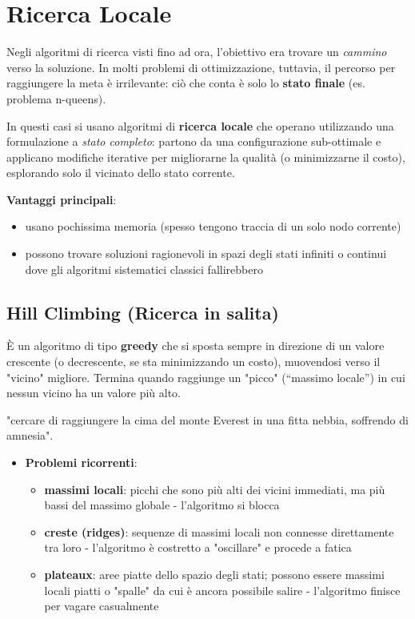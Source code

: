 \documentclass[a4paper,11pt]{report}
\begin{document}
\section{Ricerca Locale}
Negli algoritmi di ricerca visti fino ad ora, l'obiettivo era trovare un \textit{cammino} verso la soluzione. In molti problemi di ottimizzazione, tuttavia, il percorso per raggiungere la meta è irrilevante: ciò che conta è solo lo \textbf{stato finale} (es. problema n-queens).

In questi casi si usano algoritmi di \textbf{ricerca locale} che operano utilizzando una formulazione a \textit{stato completo}: partono da una configurazione sub-ottimale e applicano modifiche iterative per migliorarne la qualità (o minimizzarne il costo), esplorando solo il vicinato dello stato corrente.

\textbf{Vantaggi principali}:
\begin{itemize}
    \item usano pochissima memoria (spesso tengono traccia di un solo nodo corrente)
    \item possono trovare soluzioni ragionevoli in spazi degli stati infiniti o continui dove gli algoritmi sistematici classici fallirebbero
\end{itemize}

\subsection{Hill Climbing (Ricerca in salita)}
È un algoritmo di tipo \textbf{greedy} che si sposta sempre in direzione di un valore crescente (o decrescente, se sta minimizzando un costo), muovendosi verso il "vicino" migliore. Termina quando raggiunge un "picco" (``massimo locale'') in cui nessun vicino ha un valore più alto.

\begin{gframe}{}
"cercare di raggiungere la cima del monte Everest in una fitta nebbia, soffrendo di amnesia".
\end{gframe}

\begin{itemize}
    \item \textbf{Problemi ricorrenti}:
    \begin{itemize}
        \item \textbf{massimi locali}: picchi che sono più alti dei vicini immediati, ma più bassi del massimo globale - l'algoritmo si blocca
        \item \textbf{creste (ridges)}: sequenze di massimi locali non connesse direttamente tra loro - l'algoritmo è costretto a "oscillare" e procede a fatica
        \item \textbf{plateaux}: aree piatte dello spazio degli stati; possono essere massimi locali piatti o "spalle" da cui è ancora possibile salire - l'algoritmo finisce per vagare casualmente
    \end{itemize}
\end{itemize}
\end{document}

